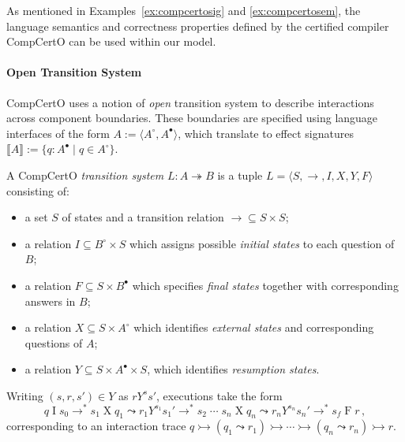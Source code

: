 \documentclass[acmsmall,nonacm]{acmart}
\newcommand{\que}{\circ}
\newcommand{\ans}{\bullet}
\begin{document}
As mentioned in Examples~\ref{ex:compcertosig} and \ref{ex:compcertosem},
the language semantics and correctness properties
defined by the certified compiler CompCertO
can be used within our model.

\paragraph{Open Transition System}
CompCertO
uses a notion of \emph{open} transition system
to describe interactions across component boundaries.
These boundaries are specified using
language interfaces of the form
$A := \langle A^\que, A^\ans \rangle$,
which translate to effect signatures
$\llbracket A \rrbracket := \{ q : A^\ans \mid q \in A^\que \}$.

A CompCertO \emph{transition system} $L : A \twoheadrightarrow B$
is a tuple $L = \langle S, {\rightarrow}, I, X, Y, F \rangle$
consisting of:
\begin{itemize}
  \item a set $S$ of states and
    a transition relation ${\rightarrow} \subseteq S \times S$;
  \item a relation $I \subseteq B^\que \times S$
    which assigns possible \emph{initial states}
    to each question of $B$;
  \item a relation $F \subseteq S \times B^\ans$
    which specifies \emph{final states} together with
    corresponding answers in $B$;
  \item a relation $X \subseteq S \times A^\que$
    which identifies \emph{external states} and
    corresponding questions of $A$;
  \item a relation $Y \subseteq S \times A^\ans \times S$,
    which identifies \emph{resumption states}.
\end{itemize}
Writing $(s, r, s') \in Y$ as $r \mathrel{Y^s} s'$,
executions take the form
\[
  q \mathrel{I} s_0 \rightarrow^*
  s_1 \mathrel{X} q_1 \leadsto
  r_1 \mathrel{Y^{s_1}} s_1' \rightarrow^*
  s_2 \mathrel{\cdots}
  s_n \mathrel{X} q_n \leadsto
  r_n \mathrel{Y^{s_n}} s_n' \rightarrow^*
  s_f \mathrel{F} r
  \,,
\]
corresponding to an interaction trace
$
  q \rightarrowtail
  (q_1 \leadsto r_1) \rightarrowtail
  \cdots \rightarrowtail
  (q_n \leadsto r_n) \rightarrowtail
  r
$.

\end{document}
